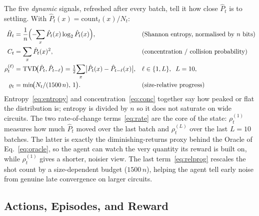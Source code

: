 \documentclass[runningheads]{llncs}
\begin{document}
The five \emph{dynamic} signals, refreshed after every batch, tell it how close
$\hat{P}_t$ is to settling. With $\hat{P}_t(x)=\mathrm{count}_t(x)/N_t$:
\begin{align}
\tilde{H}_t &= \frac{1}{n}\Bigl(-\!\!\sum_{x}\hat{P}_t(x)\log_2 \hat{P}_t(x)\Bigr),
  & &\text{(Shannon entropy, normalised by $n$ bits)} \label{eq:entropy}\\
C_t &= \sum_{x}\hat{P}_t(x)^2,
  & &\text{(concentration / collision probability)} \label{eq:conc}\\
\rho^{(\ell)}_t &= \mathrm{TVD}\!\bigl(\hat{P}_t,\hat{P}_{t-\ell}\bigr)
  = \tfrac{1}{2}\!\sum_{x}\bigl|\hat{P}_t(x)-\hat{P}_{t-\ell}(x)\bigr|,
  & &\ell\in\{1,L\},\;\; L=10, \label{eq:rate}\\
\varrho_t &= \min\!\bigl(N_t/(1500\,n),\,1\bigr).
  & &\text{(size-relative progress)} \label{eq:relprog}
\end{align}
Entropy~\eqref{eq:entropy} and concentration~\eqref{eq:conc} together say how
peaked or flat the distribution is; entropy is divided by $n$ so it does not
saturate on wide circuits. The two rate-of-change terms~\eqref{eq:rate} are the
core of the state: $\rho^{(1)}_t$ measures how much $\hat{P}_t$ moved over the
last batch and $\rho^{(L)}_t$ over the last $L=10$ batches. The latter is exactly
the diminishing-returns proxy behind the Oracle of Eq.~\eqref{eq:oracle}, so the
agent can watch the very quantity its reward is built on, while $\rho^{(1)}_t$
gives a shorter, noisier view. The last term~\eqref{eq:relprog} rescales the shot
count by a size-dependent budget ($1500\,n$), helping the agent tell early noise
from genuine late convergence on larger circuits.

\subsection{Actions, Episodes, and Reward}
\end{document}

